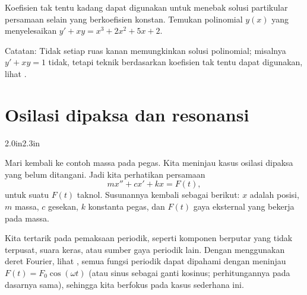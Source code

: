 \begin{exercise}
Koefisien tak tentu kadang dapat digunakan untuk menebak solusi partikular persamaan selain yang berkoefisien konstan. Temukan polinomial $y(x)$ yang menyelesaikan $y'+ x y = x^3+2x^2+5x+2$.

Catatan: Tidak setiap ruas kanan memungkinkan solusi polinomial; misalnya $y'+xy=1$ tidak, tetapi teknik berdasarkan koefisien tak tentu dapat digunakan, lihat .
\end{exercise}



\sectionnewpage
\section{Osilasi dipaksa dan resonansi} \label{forcedo:section}



\begin{mywrapfigsimp}{2.0in}{2.3in}
\noindent
{}
\end{mywrapfigsimp}
Mari kembali ke contoh massa pada pegas. Kita meninjau kasus osilasi dipaksa yang belum ditangani. Jadi kita perhatikan persamaan
\begin{equation*}
mx'' + cx' + kx = F(t) ,
\end{equation*}
untuk suatu $F(t)$ taknol. Susunannya kembali sebagai berikut: $x$ adalah posisi, $m$ massa, $c$ gesekan, $k$ konstanta pegas, dan $F(t)$ gaya eksternal yang bekerja pada massa.

Kita tertarik pada pemaksaan periodik, seperti komponen berputar yang tidak terpusat, suara keras, atau sumber gaya periodik lain. Dengan menggunakan deret Fourier, lihat , semua fungsi periodik dapat dipahami dengan meninjau $F(t) = F_0 \cos (\omega t)$ (atau sinus sebagai ganti kosinus; perhitungannya pada dasarnya sama), sehingga kita berfokus pada kasus sederhana ini.

